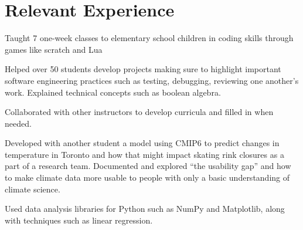 \documentclass[letterpaper,10pt]{article}
\begin{document}
    \section{Relevant Experience}
    \begin{resume_list}
        \item Taught 7 one-week classes to elementary school children in coding skills through games like scratch and Lua
        \item Helped over 50 students develop projects making sure to highlight important software engineering practices
        such as testing, debugging, reviewing one another's work. Explained technical concepts such as boolean algebra. 
        \item Collaborated with other instructors to develop curricula and filled in when needed.
    \end{resume_list}

    \begin{resume_list}
        \item Developed with another student a model using CMIP6 to predict changes in temperature in Toronto and how that might impact
        skating rink closures as a part of a research team. Documented and explored ``the usability gap'' and how to make climate data more usable to people with only a basic understanding of climate science.
        \item Used data analysis libraries for Python such as NumPy and Matplotlib, along with techniques such as linear regression.
    \end{resume_list}
    
\end{document}

